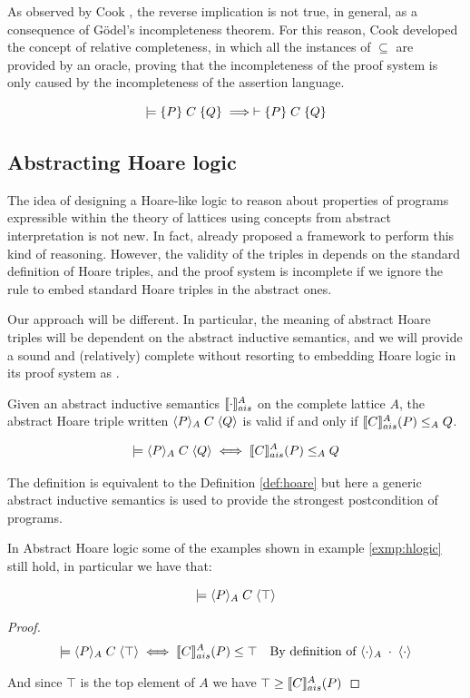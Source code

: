 \documentclass[
  10pt,       %
  twoside,    %
  a4paper,    %
  english,    %
  tikz,       %
  openright,  %
]{book}
\begin{document}
As observed by Cook \cite{Cook78}, the reverse implication is not true, in 
general, as a consequence of Gödel's incompleteness theorem. For this reason, 
Cook developed the concept of relative completeness, in which all the instances 
of $\subseteq$ are provided by an oracle, proving that the incompleteness of the 
proof system is only caused by the incompleteness of the assertion language.

\begin{theorem}
  \label{thm:hlogic-complete}
  $$\models \{ P \} \; C \; \{ Q \} \implies \vdash \{ P \} \; C \; \{ Q \}$$
\end{theorem}

\subsection{Abstracting Hoare logic}
The idea of designing a Hoare-like logic to reason about properties of programs
expressible within the theory of lattices using concepts from abstract
interpretation is not new. In fact, \cite{Cousot12} already proposed a
framework to perform this kind of reasoning. However, the validity of the
triples in \cite{Cousot12} depends on the standard definition of Hoare
triples, and the proof system is incomplete if we ignore the rule to embed
standard Hoare triples in the abstract ones.

Our approach will be different. In particular, the meaning of abstract Hoare 
triples will be dependent on the abstract inductive semantics, and we will 
provide a sound and (relatively) complete without resorting to embedding Hoare 
logic in its proof system as \cite{Cousot12}.

\begin{definition}
  \label{def:aht}
  Given an abstract inductive semantics $\llbracket \cdot \rrbracket_{ais}^{A}$ on the complete lattice
  $A$, the abstract Hoare triple written $\langle P \rangle_{A} \; C \; \langle Q \rangle$ is valid if
  and only if $\llbracket C \rrbracket_{ais}^{A}(P) \leq_A Q$.

  $$\models \langle P \rangle_{A} \; C \; \langle Q \rangle \iff \llbracket C \rrbracket_{ais}^{A}(P) \leq_A Q$$
\end{definition}

The definition is equivalent to the Definition \ref{def:hoare} 
but here a generic abstract inductive semantics is used to provide the strongest 
postcondition of programs.

In Abstract Hoare logic some of the examples shown in example \ref{exmp:hlogic} 
still hold, in particular we have that:
\begin{example}
  $$\models \langle P \rangle_{A} \; C \; \langle \top \rangle$$
\end{example}
\begin{proof}
  \begin{align*}
    \models \langle P \rangle_{A} \; C \; \langle \top \rangle
      & \iff \llbracket C \rrbracket_{ais}^{A}(P) \leq \top & \text{By definition of $\langle \cdot \rangle_{A} \; \cdot \; \langle \cdot \rangle$} \\
  \end{align*}

  And since $\top$ is the top element of $A$ we have $\top \geq \llbracket C \rrbracket_{ais}^{A}(P)$
\end{proof}
\end{document}
